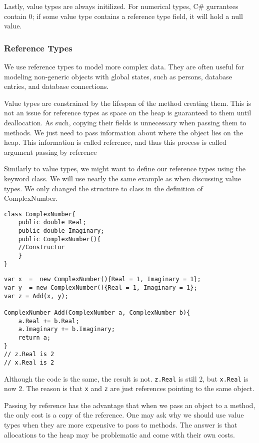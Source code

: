 Lastly, value types are always initilized. For numerical types, C\# gurrantees contain 0; if some value type contains a reference type field, it will hold a null value.

\subsubsection{Reference Types}
We use reference types to model more complex data. They are often useful for modeling non-generic objects with global states, such as persons, database entries, and database connections. 

Value types are constrained by the lifespan of the method creating them. This is not an issue for reference types as
space on the heap is guaranteed to them until deallocation.
As such, copying their fields is unnecessary when passing them to methods. We just need to pass information about where the object lies on the heap. This information is called reference, and thus this process is called argument passing by reference

Similarly to value types, we might want to define our reference types using the keyword class. We will use nearly the same example as when discussing value types. We only changed the structure to class in the definition of ComplexNumber.

\begin{lstlisting}
class ComplexNumber{
    public double Real;
    public double Imaginary;
    public ComplexNumber(){
    //Constructor
    }
}
\end{lstlisting}
\begin{lstlisting}
var x  =  new ComplexNumber(){Real = 1, Imaginary = 1};
var y  = new ComplexNumber(){Real = 1, Imaginary = 1};
var z = Add(x, y);

ComplexNumber Add(ComplexNumber a, ComplexNumber b){
    a.Real += b.Real;
    a.Imaginary += b.Imaginary;
    return a;
}
// z.Real is 2
// x.Real is 2
\end{lstlisting}
Although the code is the same, the result is not. \texttt{z.Real} is still 2, but \texttt{x.Real} is now 2. The reason is that \texttt{x} and \texttt{z} are just references pointing to the same object.

Passing by reference has the advantage that when we pass an object to a method, the only cost is a copy of the reference. One may ask why we should use value types when they are more expensive to pass to methods. The answer is that allocations to the heap may be problematic and come with their own costs.

